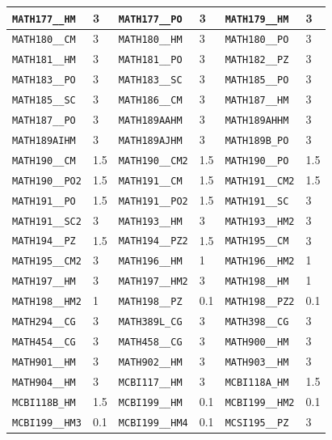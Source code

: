 \begin{longtable}{|l|l||l|l||l|l|}
    \verb|MATH177__HM| & 3 & \verb|MATH177__PO| & 3 & \verb|MATH179__HM| & 3\\\hline
    \verb|MATH180__CM| & 3 & \verb|MATH180__HM| & 3 & \verb|MATH180__PO| & 3\\\hline
    \verb|MATH181__HM| & 3 & \verb|MATH181__PO| & 3 & \verb|MATH182__PZ| & 3\\\hline
    \verb|MATH183__PO| & 3 & \verb|MATH183__SC| & 3 & \verb|MATH185__PO| & 3\\\hline
    \verb|MATH185__SC| & 3 & \verb|MATH186__CM| & 3 & \verb|MATH187__HM| & 3\\\hline
    \verb|MATH187__PO| & 3 & \verb|MATH189AAHM| & 3 & \verb|MATH189AHHM| & 3\\\hline
    \verb|MATH189AIHM| & 3 & \verb|MATH189AJHM| & 3 & \verb|MATH189B_PO| & 3\\\hline
    \verb|MATH190__CM| & 1.5 & \verb|MATH190__CM2| & 1.5 & \verb|MATH190__PO| & 1.5\\\hline
    \verb|MATH190__PO2| & 1.5 & \verb|MATH191__CM| & 1.5 & \verb|MATH191__CM2| & 1.5\\\hline
    \verb|MATH191__PO| & 1.5 & \verb|MATH191__PO2| & 1.5 & \verb|MATH191__SC| & 3\\\hline
    \verb|MATH191__SC2| & 3 & \verb|MATH193__HM| & 3 & \verb|MATH193__HM2| & 3\\\hline
    \verb|MATH194__PZ| & 1.5 & \verb|MATH194__PZ2| & 1.5 & \verb|MATH195__CM| & 3\\\hline
    \verb|MATH195__CM2| & 3 & \verb|MATH196__HM| & 1 & \verb|MATH196__HM2| & 1\\\hline
    \verb|MATH197__HM| & 3 & \verb|MATH197__HM2| & 3 & \verb|MATH198__HM| & 1\\\hline
    \verb|MATH198__HM2| & 1 & \verb|MATH198__PZ| & 0.1 & \verb|MATH198__PZ2| & 0.1\\\hline
    \verb|MATH294__CG| & 3 & \verb|MATH389L_CG| & 3 & \verb|MATH398__CG| & 3\\\hline
    \verb|MATH454__CG| & 3 & \verb|MATH458__CG| & 3 & \verb|MATH900__HM| & 3\\\hline
    \verb|MATH901__HM| & 3 & \verb|MATH902__HM| & 3 & \verb|MATH903__HM| & 3\\\hline
    \verb|MATH904__HM| & 3 & \verb|MCBI117__HM| & 3 & \verb|MCBI118A_HM| & 1.5\\\hline
    \verb|MCBI118B_HM| & 1.5 & \verb|MCBI199__HM| & 0.1 & \verb|MCBI199__HM2| & 0.1\\\hline
    \verb|MCBI199__HM3| & 0.1 & \verb|MCBI199__HM4| & 0.1 & \verb|MCSI195__PZ| & 3\\\hline

\end{longtable}

